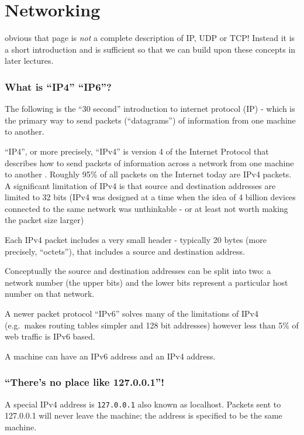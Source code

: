 \chapter{Networking} obvious that page is \emph{not} a complete
description of IP, UDP or TCP! Instead it is a short introduction and is
sufficient so that we can build upon these concepts in later lectures.

\subsection{\texorpdfstring{What is ``IP4''
``IP6''?}{What is IP4 IP6?}}\label{what-is-ip4-ip6}

The following is the ``30 second'' introduction to internet protocol
(IP) - which is the primary way to send packets (``datagrams'') of
information from one machine to another.

``IP4'', or more precisely, ``IPv4'' is version 4 of the Internet
Protocol that describes how to send packets of information across a
network from one machine to another . Roughly 95\% of all packets on the
Internet today are IPv4 packets. A significant limitation of IPv4 is
that source and destination addresses are limited to 32 bits (IPv4 was
designed at a time when the idea of 4 billion devices connected to the
same network was unthinkable - or at least not worth making the packet
size larger)

Each IPv4 packet includes a very small header - typically 20 bytes (more
precisely, ``octets''), that includes a source and destination address.

Conceptually the source and destination addresses can be split into two:
a network number (the upper bits) and the lower bits represent a
particular host number on that network.

A newer packet protocol ``IPv6'' solves many of the limitations of IPv4
(e.g.~makes routing tables simpler and 128 bit addresses) however less
than 5\% of web traffic is IPv6 based.

A machine can have an IPv6 address and an IPv4 address.

\subsection{\texorpdfstring{``There's no place like
127.0.0.1''!}{There's no place like 127.0.0.1!}}\label{theres-no-place-like-127.0.0.1}

A special IPv4 address is \texttt{127.0.0.1} also known as localhost.
Packets sent to 127.0.0.1 will never leave the machine; the address is
specified to be the same machine.

